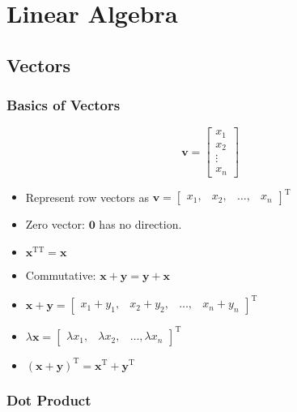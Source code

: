 \chapter{Linear Algebra}

\section{Vectors}

\subsection{Basics of Vectors}
\[
    \mathbf{v} = \begin{bmatrix}
        x_1 \\
        x_2 \\
        \vdots \\
        x_n
    \end{bmatrix}
\]

\begin{itemize}
    \item Represent row vectors as $\mathbf{v} = \begin{bmatrix}
                  x_1, & x_2, & \dots, & x_n
    \end{bmatrix}^\mathrm{T}$
    \item Zero vector: $\mathbf{0}$ has no direction.
    \item $\mathbf{x}^{\mathrm{T}\mathrm{T}} = \mathbf{x}$
    \item Commutative: $\mathbf{x} + \mathbf{y} = \mathbf{y} + \mathbf{x}$
    \item $\mathbf{x} + \mathbf{y} = \begin{bmatrix}
                                         x_1 + y_1, & x_2 + y_2, & \dots, & x_n + y_n
    \end{bmatrix}^\mathrm{T}$
    \item $\lambda \mathbf{x} = \begin{bmatrix}
                                    \lambda x_1, & \lambda x_2, & \dots, \lambda x_n
    \end{bmatrix}^\mathrm{T}$
    \item $(\mathbf{x} + \mathbf{y})^\mathrm{T} = \mathbf{x}^\mathrm{T} + \mathbf{y}^\mathrm{T}$
\end{itemize}

\subsection{Dot Product}

